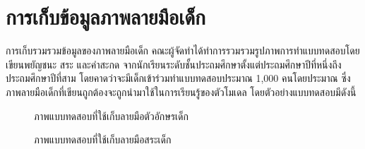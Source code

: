 \documentclass[12pt,oneside,openright,a4paper]{cpe-thai-project}
\begin{document}
\section{การเก็บข้อมูลภาพลายมือเด็ก}
การเก็บรวมรวมข้อมูลของภาพลายมือเด็ก คณะผู้จัดทำได้ทำการรวมรวมรูปภาพการทำแบบทดสอบโดยเขียนพยัญชนะ สระ และคำสะกด 
จากนักเรียนระดับชั้นประถมศึกษาตั้งแต่ประถมศึกษาปีที่หนึ่งถึงประถมศึกษาปีที่สาม โดยคาดว่าจะมีเด็กเข้าร่วมทำแบบทดสอบประมาณ 1,000 
คนโดยประมาณ ซึ่งภาพลายมือเด็กที่เขียนถูกต้องจะถูกนำมาใช้ในการเรียนรู้ของตัวโมเดล โดยตัวอย่างแบบทดสอบมีดังนี้
\begin{figure}[!ht]\centering
  \setlength{\fboxrule}{0.2mm} %
  \setlength{\fboxsep}{1cm}
  \caption{ภาพแบบทดสอบที่ใช้เก็บลายมือตัวอักษรเด็ก}\label{fig:system}
    
\end{figure}
\newpage
\begin{figure}[!ht]\centering
  \setlength{\fboxrule}{0.2mm} %
  \setlength{\fboxsep}{1cm}
  \caption{ภาพแบบทดสอบที่ใช้เก็บลายมือสระเด็ก}\label{fig:system}
    
\end{figure}
\end{document}
